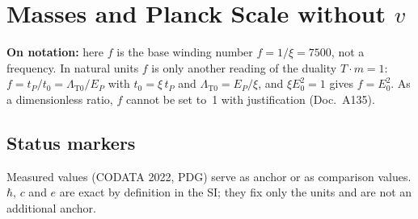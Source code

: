 
\providecommand{\BM}{\textbf{[B]}}
\providecommand{\KM}{\textbf{[K]}}
\providecommand{\SM}{\textbf{[S]}}

\chapter*{Masses and Planck Scale without \texorpdfstring{$v$}{v}}

\begin{abstract}
The lepton ladder of the corpus writes the masses as $m_i=r_i\,\xi^{p_i}\,v$ and uses
the electroweak scale $v$ as an intermediate quantity; the Planck scale is reached
separately through the formula for $G$ with the conversion factor $C_{\text{conv}}$.
Read this way, the calculation seems to need two anchors, one for $v$ and one for
$E_P$. It does not. Doc.~149 links $v$ and $E_P$ directly:
$v=E_P/(f^4\cdot(\pi/2)\cdot10)$, i.e.\ $v/E_P=\xi^4/(5\pi)=2.012\times10^{-17}$,
$-0.23\,\%$ against the measured value \KM. Inserted into the ladder, $v$ drops out:
$m_i=\frac{r_i}{5\pi}\,\xi^{p_i+4}\,E_P$ \BM. All three lepton masses, $E_P$, $G$,
$\ell_P$ and $L_0$ then hang on a single chain, and one measured value as anchor fixes
all numbers. With $m_e$ as anchor one obtains $E_P=1.237\times10^{19}$\,GeV
($+1.34\,\%$), $G=6.50\times10^{-11}$ ($-2.6\,\%$), $\ell_P=1.595\times10^{-35}$\,m
and $L_0=2.127\times10^{-39}$\,m \KM. The deviations are the known bare residues of
the ladder, not a second anchor.
\end{abstract}

\noindent\textbf{On notation:} here $f$ is the base winding number $f = 1/\xi = 7500$, not a frequency. In natural units $f$ is only another reading of the duality $T\cdot m = 1$: $f = t_P/t_0 = \Lambda_{\text{T0}}/E_P$ with $t_0 = \xi\,t_P$ and $\Lambda_{\text{T0}} = E_P/\xi$, and $\xi E_0^2 = 1$ gives $f = E_0^2$. As a dimensionless ratio, $f$ cannot be set to~1 with justification (Doc.~A135).

\section*{Status markers}

Measured values (CODATA 2022, PDG) serve as anchor or as comparison values. $\hbar$,
$c$ and $e$ are exact by definition in the SI; they fix only the units and are not an
additional anchor.

